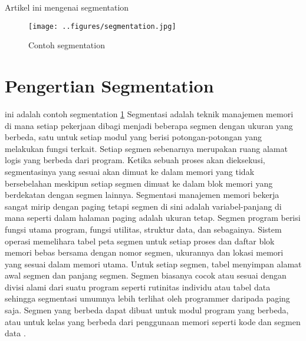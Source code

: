 ﻿%


Artikel ini mengenai segmentation

  \begin{figure}[ht]
  \centerline{\texttt{[image: ..figures/segmentation.jpg]}}
  \caption{Contoh segmentation}
  \label{segmentation}
  \end{figure}

\section{Pengertian Segmentation}
ini adalah contoh segmentation \ref{segmentation}
Segmentasi adalah teknik manajemen memori di mana setiap pekerjaan dibagi menjadi beberapa segmen dengan ukuran yang berbeda, satu untuk setiap modul yang berisi potongan-potongan yang melakukan fungsi terkait. Setiap segmen sebenarnya merupakan ruang alamat logis yang berbeda dari program. Ketika sebuah proses akan dieksekusi, segmentasinya yang sesuai akan dimuat ke dalam memori yang tidak bersebelahan meskipun setiap segmen dimuat ke dalam blok memori yang berdekatan dengan segmen lainnya.
Segmentasi manajemen memori bekerja sangat mirip dengan paging tetapi segmen di sini adalah variabel-panjang di mana seperti dalam halaman paging adalah ukuran tetap.
Segmen program berisi fungsi utama program, fungsi utilitas, struktur data, dan sebagainya. Sistem operasi memelihara tabel peta segmen untuk setiap proses dan daftar blok memori bebas bersama dengan nomor segmen, ukurannya dan lokasi memori yang sesuai dalam memori utama. Untuk setiap segmen, tabel menyimpan alamat awal segmen dan panjang segmen.
Segmen biasanya cocok atau sesuai dengan divisi alami dari suatu program seperti rutinitas individu atau tabel data sehingga segmentasi umumnya lebih terlihat oleh programmer daripada paging saja.  Segmen yang berbeda dapat dibuat untuk modul program yang berbeda, atau untuk kelas yang berbeda dari penggunaan memori seperti kode dan segmen data \cite{cepulis1992computer}.

